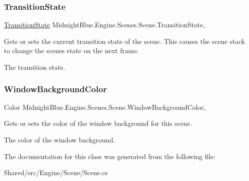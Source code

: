 \subsubsection{\texorpdfstring{Transition\+State}{TransitionState}}
{\footnotesize\ttfamily \hyperlink{namespace_midnight_blue_1_1_engine_1_1_scenes_a829c47ebe553886b3b3e92db386e2557}{Transition\+State} Midnight\+Blue.\+Engine.\+Scenes.\+Scene.\+Transition\+State\hspace{0.3cm}{\ttfamily [get]}, {\ttfamily [set]}}



Gets or sets the current transition state of the scene. This causes the scene stack to change the scenes state on the next frame. 

The transition state.\hypertarget{class_midnight_blue_1_1_engine_1_1_scenes_1_1_scene_abbf66efd894bdd76cc0f0f924591c62f}{}\label{class_midnight_blue_1_1_engine_1_1_scenes_1_1_scene_abbf66efd894bdd76cc0f0f924591c62f} 
\subsubsection{\texorpdfstring{Window\+Background\+Color}{WindowBackgroundColor}}
{\footnotesize\ttfamily Color Midnight\+Blue.\+Engine.\+Scenes.\+Scene.\+Window\+Background\+Color\hspace{0.3cm}{\ttfamily [get]}, {\ttfamily [set]}}



Gets or sets the color of the window background for this scene. 

The color of the window background.

The documentation for this class was generated from the following file\+:\begin{DoxyCompactItemize}
\item 
Shared/src/\+Engine/\+Scene/Scene.\+cs\end{DoxyCompactItemize}
